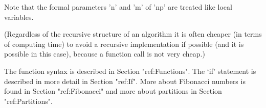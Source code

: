 Note that the formal parameters 'n' and 'm' of 'np' are treated like
local variables.

(Regardless   of the recursive structure of   an algorithm it is often
cheaper (in    terms  of  computing    time)  to  avoid  a   recursive
implementation if possible (and it  is possible in this case), because
a function call is not very cheap.)


The function  syntax is described  in Section "ref:Functions".   The `if'
statement is described  in more detail in  Section "ref:If".  More  about
Fibonacci  numbers is found  in  Section "ref:Fibonacci"  and more  about
partitions in Section "ref:Partitions".


